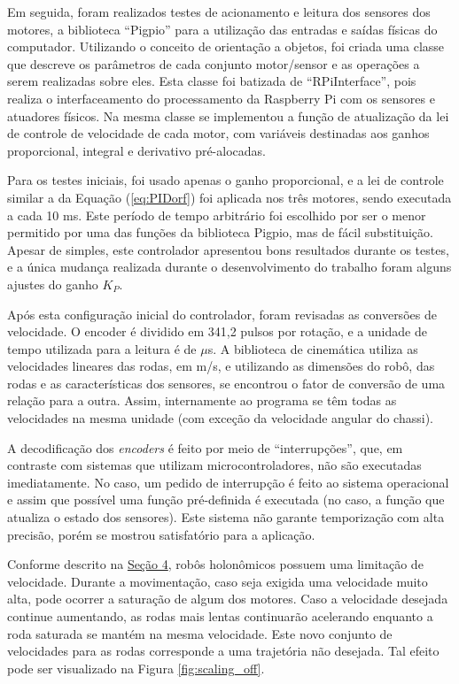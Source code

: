 Em seguida, foram realizados testes de acionamento e leitura dos sensores dos motores, a biblioteca ``Pi\acrshort{gpio}'' \citep{pigpio} para a utilização das entradas e saídas físicas do computador. Utilizando o conceito de orientação a objetos, foi criada uma classe que descreve os parâmetros de cada conjunto motor/sensor e as operações a serem realizadas sobre eles. Esta classe foi batizada de ``RPiInterface'', pois realiza o interfaceamento do processamento da Raspberry Pi com os sensores e atuadores físicos.
Na mesma classe se implementou a função de atualização da lei de controle de velocidade de cada motor, com variáveis destinadas aos ganhos proporcional, integral e derivativo pré-alocadas.

Para os testes iniciais, foi usado apenas o ganho proporcional, e a lei de controle similar a da Equação (\ref{eq:PIDorf}) foi aplicada nos três motores, sendo executada a cada 10 ms. Este período de tempo arbitrário foi escolhido por ser o menor permitido por uma das funções da biblioteca Pi\acrshort{gpio}, mas de fácil substituição. Apesar de simples, este controlador apresentou bons resultados durante os testes, e a única mudança realizada durante o desenvolvimento do trabalho foram alguns ajustes do ganho $K_P$.

Após esta configuração inicial do controlador, foram revisadas as conversões de velocidade. O encoder é dividido em 341,2 pulsos por rotação, e a unidade de tempo utilizada para a leitura é de $\mu$s. A biblioteca de cinemática utiliza as velocidades lineares das rodas, em m/s, e utilizando as dimensões do robô, das rodas e as características dos sensores, se encontrou o fator de conversão de uma relação para a outra. Assim, internamente ao programa se têm todas as velocidades na mesma unidade (com exceção da velocidade angular do chassi).

A decodificação dos \textit{encoders} é feito por meio de ``interrupções'', que, em contraste com sistemas que utilizam microcontroladores, não são executadas imediatamente. No caso, um pedido de interrupção é feito ao sistema operacional e assim que possível uma função pré-definida é executada (no caso, a função que atualiza o estado dos sensores). Este sistema não garante temporização com alta precisão, porém se mostrou satisfatório para a aplicação.

Conforme descrito na \hyperref[sec:software]{Seção 4}, robôs holonômicos possuem uma limitação de velocidade. Durante a movimentação, caso seja exigida uma velocidade muito alta, pode ocorrer a saturação de algum dos motores. Caso a velocidade desejada continue aumentando, as rodas mais lentas continuarão acelerando enquanto a roda saturada se mantém na mesma velocidade. Este novo conjunto de velocidades para as rodas corresponde a uma trajetória não desejada. Tal efeito pode ser visualizado na Figura \ref{fig:scaling_off}.

